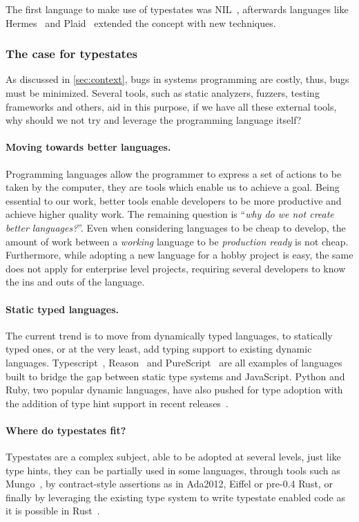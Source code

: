 The first language to make use of typestates was NIL~\autocite{Strom1983},
afterwards languages like Hermes~\autocite{Strom1990} and Plaid~\autocite{Aldrich2009}
extended the concept with new techniques.

\subsubsection*{The case for typestates}

As discussed in \autoref{sec:context}, bugs in systems programming are costly,
thus, bugs must be minimized.
Several tools, such as static analyzers, fuzzers, testing frameworks and others,
aid in this purpose, if we have all these external tools,
why should we not try and leverage the programming language itself?

\paragraph{Moving towards better languages.}
Programming languages allow the programmer to express a set of actions to be taken by the computer,
they are tools which enable us to achieve a goal.
Being essential to our work, better tools enable developers to be more productive and achieve higher quality work.
The remaining question is “\emph{why do we not create better languages?}”.
Even when considering languages to be cheap to develop,
the amount of work between a \emph{working} language to be \emph{production ready} is not cheap.
Furthermore, while adopting a new language for a hobby project is easy,
the same does not apply for enterprise level projects,
requiring several developers to know the ins and outs of the language.

\paragraph{Static typed languages.}
The current trend is to move from dynamically typed languages,
to statically typed ones, or at the very least, add typing support to existing dynamic languages.
Typescript~\autocite{typescript},
Reason~\autocite{reason} and
PureScript~\autocite{purescript}
are all examples of languages built to bridge the gap between static type systems and JavaScript.
Python and Ruby, two popular dynamic languages, have also pushed for type adoption
with the addition of type hint support in recent
releases~\autocite{PythonTyping, RubyRBS}.

\paragraph{Where do typestates fit?}
Typestates are a complex subject, able to be adopted at several levels,
just like type hints, they can be partially used in some languages,
through tools such as Mungo~\autocite{Voinea2020},
by contract-style assertions as in Ada2012, Eiffel or pre-0.4 Rust,
or finally by leveraging the existing type system to write typestate enabled code as it is possible in
Rust~\autocite{Duarte2020}.


